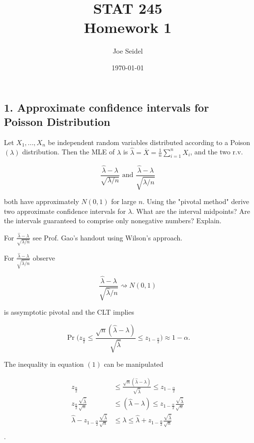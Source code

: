 \documentclass{tufte-book}
\title{STAT  245\\Homework 1}
\author{Joe Seidel}
\date{\today}
\begin{document}
\maketitle
{}
\newpage
{}

\subsection{1. Approximate confidence intervals for Poisson Distribution}
Let $X_1,...,X_n$ be independent random variables distributed according to a Poison$(\lambda)$ distribution.  Then the MLE of $\lambda$ is $\hat{\lambda}=\overline{X}= \frac{1}{n}\sum_{i=1}^nX_i$, and the two r.v.

\[ \frac{\hat{\lambda} - \lambda}{\sqrt{\lambda/n}}\text{ and } \frac{\hat{\lambda} - \lambda}{\sqrt{\hat{\lambda}/n}} \]

both have approximately $N(0,1)$ for large $n$.  Using the "pivotal method" derive two approximate confidence intervals for $\lambda$.  What are the interval midpoints?  Are the intervals guaranteed to comprise only nonegative numbers?  Explain.

For $\frac{\hat{\lambda} - \lambda}{\sqrt{\lambda/n}}$ see Prof. Gao's handout using Wilson's approach.

For $\frac{\hat{\lambda} - \lambda}{\sqrt{\hat{\lambda}/n}}$ observe

\[ \frac{\hat{\lambda} - \lambda}{\sqrt{\hat{\lambda}/n}}  \rightsquigarrow N(0,1) \]

is assymptotic pivotal and the CLT implies

\begin{equation}
\Pr\big( z_{\frac{\alpha}{2}} \leq \frac{\sqrt{n}(\hat{\lambda}-\lambda)}{\sqrt{\hat{\lambda}}} \leq z_{1-\frac{\alpha}{2}} \big) \approx 1-\alpha.
\end{equation}

The inequality in equation $(1)$ can be manipulated

\begin{align*}
z_{\frac{\alpha}{2}} &\leq \frac{\sqrt{n}(\hat{\lambda}-\lambda)}{\sqrt{\hat{\lambda}}} \leq z_{1-\frac{\alpha}{2}}\\
z_{\frac{\alpha}{2}}\frac{\sqrt{\hat{\lambda}}}{\sqrt{n}} &\leq (\hat{\lambda}-\lambda) \leq z_{1-\frac{\alpha}{2}}\frac{\sqrt{\hat{\lambda}}}{\sqrt{n}}\\
\hat{\lambda} - z_{1-\frac{\alpha}{2}}\frac{\sqrt{\hat{\lambda}}}{\sqrt{n}} &\leq \lambda \leq \hat{\lambda} + z_{1-\frac{\alpha}{2}}\frac{\sqrt{\hat{\lambda}}}{\sqrt{n}}\\
\end{align*}.
\end{document}
